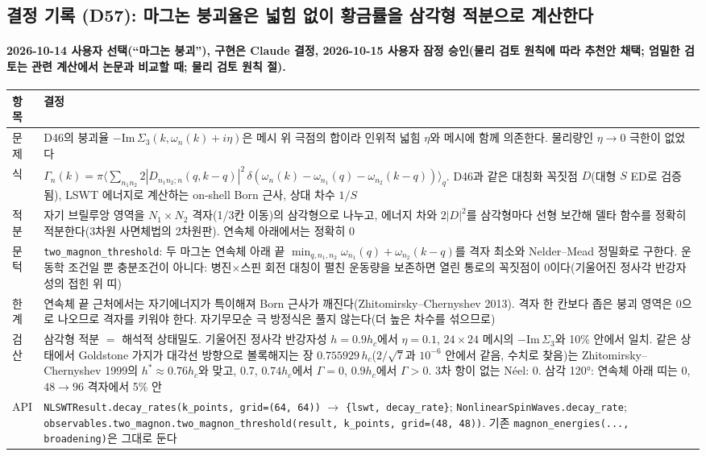 \subsection{결정 기록 (D57): 마그논 붕괴율은 넓힘 없이 황금률을 삼각형 적분으로 계산한다}\label{decisions-d57-decay}
\begingroup%
  \framesubtitle{2026-10-14 사용자 선택(``마그논 붕괴''), 구현은 Claude 결정, 2026-10-15 사용자 잠정 승인(물리 검토 원칙에 따라 추천안 채택; 엄밀한 검토는 관련 계산에서 논문과 비교할 때; 물리 검토 원칙 절).}
  \small\renewcommand{\arraystretch}{1.12}
  \begin{tabularx}{\textwidth}{@{}P{3.0cm}Y@{}}
    \toprule
    항목 & 결정 \\
    \midrule
    문제 & D46의 붕괴율 $-\mathrm{Im}\,\Sigma_3(k,\omega_n(k)+i\eta)$은 메시 위 극점의 합이라 인위적 넓힘 $\eta$와 메시에 함께 의존한다. 물리량인 $\eta\to0$ 극한이 없었다 \\
    식 & $\Gamma_n(k)=\pi\langle\sum_{n_1n_2}2|D_{n_1n_2;n}(q,k-q)|^2\,\delta(\omega_n(k)-\omega_{n_1}(q)-\omega_{n_2}(k-q))\rangle_q$. D46과 같은 대칭화 꼭짓점 $D$(대형 $S$ ED로 검증됨), LSWT 에너지로 계산하는 on-shell Born 근사, 상대 차수 $1/S$ \\
    적분 & 자기 브릴루앙 영역을 $N_1\times N_2$ 격자(1/3칸 이동)의 삼각형으로 나누고, 에너지 차와 $2|D|^2$를 삼각형마다 선형 보간해 델타 함수를 정확히 적분한다(3차원 사면체법의 2차원판). 연속체 아래에서는 정확히 0 \\
    문턱 & \texttt{two\_magnon\_threshold}: 두 마그논 연속체 아래 끝 $\min_{q,n_1,n_2}\omega_{n_1}(q)+\omega_{n_2}(k-q)$를 격자 최소와 Nelder--Mead 정밀화로 구한다. 운동학 조건일 뿐 충분조건이 아니다: 병진$\times$스핀 회전 대칭이 펼친 운동량을 보존하면 열린 통로의 꼭짓점이 0이다(기울어진 정사각 반강자성의 접힌 위 띠) \\
    한계 & 연속체 끝 근처에서는 자기에너지가 특이해져 Born 근사가 깨진다(Zhitomirsky--Chernyshev 2013). 격자 한 칸보다 좁은 붕괴 영역은 0으로 나오므로 격자를 키워야 한다. 자기무모순 극 방정식은 풀지 않는다(더 높은 차수를 섞으므로) \\
    검산 & 삼각형 적분 $=$ 해석적 상태밀도. 기울어진 정사각 반강자성 $h=0.9h_c$에서 $\eta=0.1$, $24\times24$ 메시의 $-\mathrm{Im}\,\Sigma_3$와 10\% 안에서 일치. 같은 상태에서 Goldstone 가지가 대각선 방향으로 볼록해지는 장 $0.755929\,h_c$($2/\sqrt7$과 $10^{-6}$ 안에서 같음, 수치로 찾음)는 Zhitomirsky--Chernyshev 1999의 $h^*\approx0.76h_c$와 맞고, $0.7$, $0.74h_c$에서 $\Gamma=0$, $0.9h_c$에서 $\Gamma>0$. 3차 항이 없는 Néel: 0. 삼각 120°: 연속체 아래 띠는 0, $48\to96$ 격자에서 5\% 안 \\
    API & \texttt{NLSWTResult.decay\_rates(k\_points, grid=(64, 64))} $\to$ \texttt{\{lswt, decay\_rate\}}; \texttt{NonlinearSpinWaves.decay\_rate}; \texttt{observables.two\_magnon.two\_magnon\_threshold(result, k\_points, grid=(48, 48))}. 기존 \texttt{magnon\_energies(..., broadening)}은 그대로 둔다 \\
    \bottomrule
  \end{tabularx}
\endgroup

